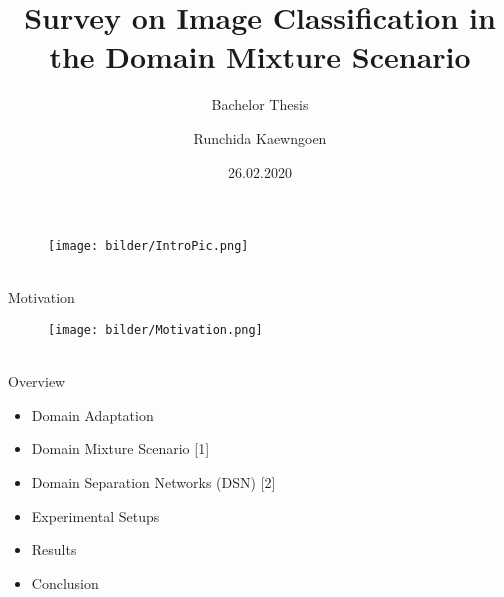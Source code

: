 \documentclass[accentcolor=tud4b,colorbacktitle,inverttitle,landscape,german,presentation,t]{tudbeamer}
\begin{document}
\title[]{Survey on Image Classification in the Domain Mixture Scenario}
\subtitle{Bachelor Thesis}
\author[Runchida Kaewngoen]{Runchida Kaewngoen}





\date{26.02.2020}	
\begin{titleframe}
	\begin{center}
	\vspace{3cm}
		\begin{figure}
		\texttt{[image: bilder/IntroPic.png]}
		\end{figure} 
	\end{center}
\end{titleframe}


\begin{frame}{\\Motivation}
	\vspace{-0.5cm}
	\begin{figure}
		\centering
		\texttt{[image: bilder/Motivation.png]}
	\end{figure}
\end{frame}

\begin{frame}{\\Overview}
 	\begin{itemize}
  		\item Domain Adaptation
 		\item Domain Mixture Scenario [1]
		\item Domain Separation Networks (DSN) [2]
 		\item Experimental Setups
		\item Results
		\item Conclusion
	\end{itemize}
\end{frame}
\end{document}
